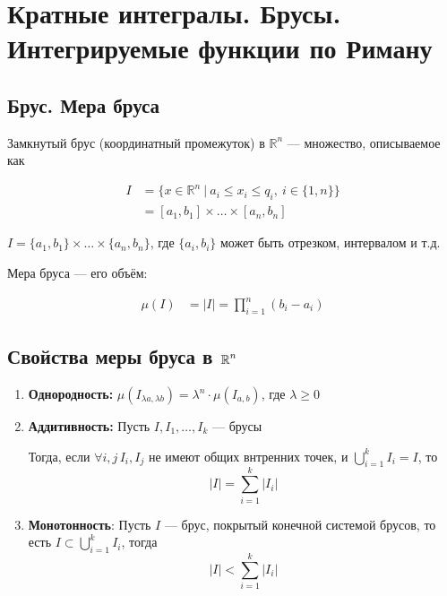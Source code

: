 \section{Кратные интегралы. Брусы. Интегрируемые функции по Риману}

\subsection{Брус. Мера бруса}

 Замкнутый брус (координатный промежуток) в $\mathbb{R}^n$ — множество, описываемое как

\begin{equation*}
\begin{aligned}
    I&=\{x\in\mathbb{R}^n\ |\ a_i\leq x_i\leq q_i,\ i\in\{1,n\}\}\\
    &=\left[a_1,b_1\right]\times\ldots\times\left[a_n,b_n\right]
\end{aligned}
\end{equation*}

\comment $I=\{a_1,b_1\}\times\ldots\times\{a_n,b_n\}$, где $\{a_i, b_i\}$ может быть отрезком, интервалом и т.д.

 Мера бруса — его объём:

\begin{equation*}
    \begin{aligned}
        \mu(I)&=|I|
        =\prod_{i=1}^{n} (b_i-a_i)
    \end{aligned}
\end{equation*}

\subsection{Свойства меры бруса в $\operatorname{\mathbb{R}}^n$}

\begin{enumerate}
    \item \textbf{Однородность:} $\mu(I_{\lambda a,\lambda b})=\lambda^n\cdot\mu(I_{a,b})$, где $\lambda\geq
    0$
    \item \textbf{Аддитивность:} Пусть $I, I_1, \ldots, I_k$ — брусы
    
    Тогда, если $\forall i, j\, I_i, I_j$ не имеют общих внтренних точек, и $\displaystyle\bigcup_{i=1}^kI_i = I$, то
    $$|I| = \sum_{i=1}^k|I_i|$$
    \item \textbf{Монотонность}: Пусть $I$ — брус, покрытый конечной системой брусов, то есть $I\subset \displaystyle\bigcup_{i=1}^kI_i$, тогда
    $$|I| < \sum_{i=1}^k|I_i|$$
\end{enumerate}

